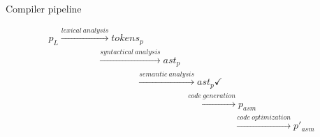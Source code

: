 \documentclass{beamer}
\begin{document}
\begin{frame}{Compiler pipeline}


$$
\begin{array}{lllll}
p_L \xrightarrow{\mathit{lexical \ analysis}} \mathit{tokens}_p \\
\quad \qquad \qquad \xrightarrow{\mathit{syntactical \ analysis}} ast_p \\
\quad \qquad \qquad \qquad\qquad\xrightarrow{\mathit{semantic \ analysis}} ast_p \checkmark \\
\quad \qquad \quad \qquad \qquad \qquad\qquad\qquad\xrightarrow{\mathit{code \ generation}} p_{asm} \\
\quad \qquad \qquad \qquad \qquad \qquad \qquad\qquad\qquad\qquad\xrightarrow{\mathit{code \ optimization}} p'_{asm}
\end{array}
$$

\end{frame}

\end{document}

